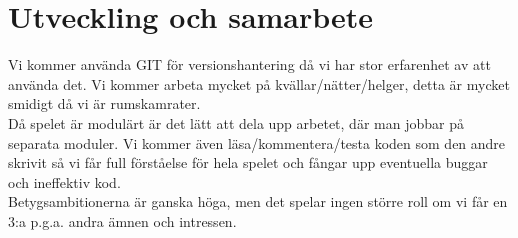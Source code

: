 \section{Utveckling och samarbete}
Vi kommer använda GIT för versionshantering då vi har stor erfarenhet av att använda det. Vi kommer arbeta mycket på kvällar/nätter/helger, detta är mycket smidigt då vi är rumskamrater.\\
\vspace{11pt}
Då spelet är modulärt är det lätt att dela upp arbetet, där man jobbar på separata moduler. Vi kommer även läsa/kommentera/testa koden som den andre skrivit så vi får full förståelse för hela spelet och fångar upp eventuella buggar och ineffektiv kod.\\
\vspace{11pt}
Betygsambitionerna är ganska höga, men det spelar ingen större roll om vi får en 3:a p.g.a. andra ämnen och intressen.\\
